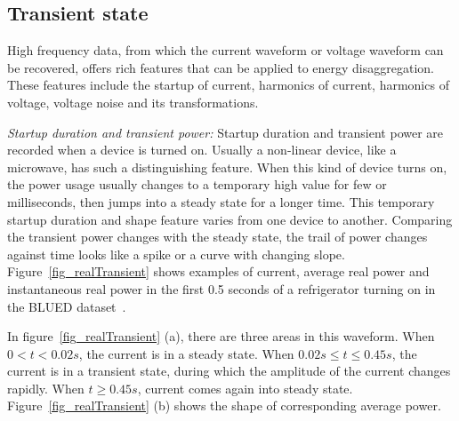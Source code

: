\subsection*{Transient state}
High frequency data, 
from which the current waveform or voltage waveform can be recovered, 
offers rich features that can be applied to energy disaggregation. 
These features include the startup of current, 
harmonics of current, 
harmonics of voltage, 
voltage noise and its transformations. 

\textit{Startup duration and transient power:}
Startup duration and transient power are recorded when a device is turned on. 
Usually a non-linear device, like a microwave, has such a distinguishing feature.
When this kind of device turns on,
the power usage usually changes to a temporary high value for few 
or milliseconds, %
then jumps into a steady state for a longer time.
This temporary startup duration and shape feature varies from one device to another. 
Comparing the transient power changes with the steady state, 
the trail of power changes against time looks like a spike or a curve with changing slope. 
Figure~\ref{fig_realTransient} shows examples of current, average real power and instantaneous
real power in the first 0.5 seconds of a refrigerator turning on in the 
BLUED dataset~\cite{anderson2012blued}. 
\iffalse
 \manishc{you said 0.5 sec in the previous
  sec; make it consistent, and this sentence seems like a repetition} \huijuanc{updated, and remove the repeated sentence}. 
\fi  
In figure~\ref{fig_realTransient} (a), there are three areas in this waveform.
When $0<t<0.02s$, the current is in
a steady state.
When $0.02s \leq t \leq 0.45s$,
the current is in a transient state,
during which the amplitude of the current changes
rapidly. 
When $ t \geq 0.45s$, current comes again into
steady state.
Figure~\ref{fig_realTransient} (b) shows the shape of corresponding average power. 
\iffalse
{} 
